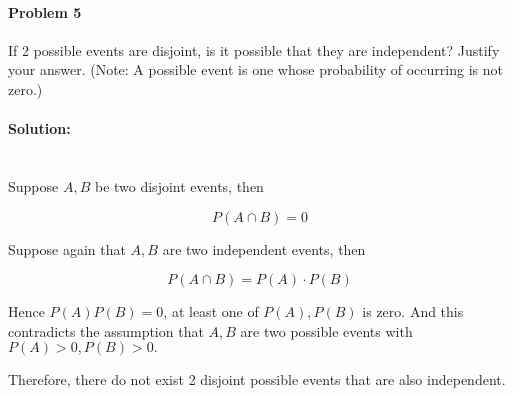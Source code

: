\documentclass[a4paper, 11pt, twoside]{article}
\begin{document}
\pagebreak

\paragraph{Problem 5}

If 2 possible events are disjoint, is it possible that they are independent? Justify your answer. (Note: A possible event is one whose probability of occurring is not zero.)\\

\paragraph{Solution:}\ \\

Suppose $A, B$ be two disjoint events, then

\[P(A\cap B)=0\]

Suppose again that $A, B$ are two independent events, then

\[P(A\cap B)=P(A)\cdot P(B)\]

Hence $P(A)P(B)=0$, at least one of $P(A), P(B)$ is zero. And this contradicts the assumption that $A,B$ are two possible events with $P(A)>0, P(B)>0.$

Therefore, there do not exist 2 disjoint possible events that are also independent.
\end{document}
